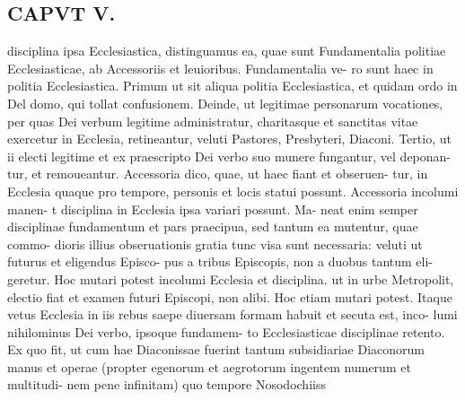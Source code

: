 \documentclass{article}
\begin{document}
\begin{pages}
\section*{CAPVT  V. }
\marginpar{[ p.289 ]}disciplina ipsa Ecclesiastica, distinguamus ea, quae sunt Fundamentalia politiae Ecclesiasticae, ab Accessoriis et leuioribus. Fundamentalia ve- ro sunt haec in politia Ecclesiastica. Primum ut sit aliqua politia Ecclesiastica, et quidam ordo in Del domo, qui tollat confusionem. Deinde, ut legitimae personarum vocationes, per quas Dei verbum legitime administratur, charitasque et sanctitas vitae exercetur in Ecclesia, retineantur, veluti Pastores, Presbyteri, Diaconi. Tertio, ut ii electi legitime et ex praescripto Dei verbo suo munere fungantur, vel deponan- tur, et remoueantur. Accessoria dico, quae, ut haec fiant et obseruen- tur, in Ecclesia quaque pro tempore, personis et locis statui possunt. Accessoria incolumi manen- t disciplina in Ecclesia ipsa variari possunt. Ma- neat enim semper disciplinae fundamentum et pars praecipua, sed tantum ea mutentur, quae commo- dioris illius obseruationis gratia tunc visa sunt necessaria: veluti ut futurus et eligendus Episco- pus a tribus Episcopis, non a duobus tantum eli- geretur. Hoc mutari potest incolumi Ecclesia et disciplina. ut in urbe Metropolit, electio fiat et examen futuri Episcopi, non alibi. Hoc etiam mutari potest. Itaque vetus Ecclesia in iis rebus saepe diuersam formam habuit et secuta est, inco- lumi nihilominus Dei verbo, ipsoque fundamem- to Ecclesiasticae disciplinae retento. Ex quo fit, ut cum hae Diaconissae fuerint tantum subsidiariae Diaconorum manus et operae (propter egenorum et aegrotorum ingentem numerum et multitudi- nem pene infinitam) quo tempore Nosodochiiss 

\end{pages}
\end{document}
